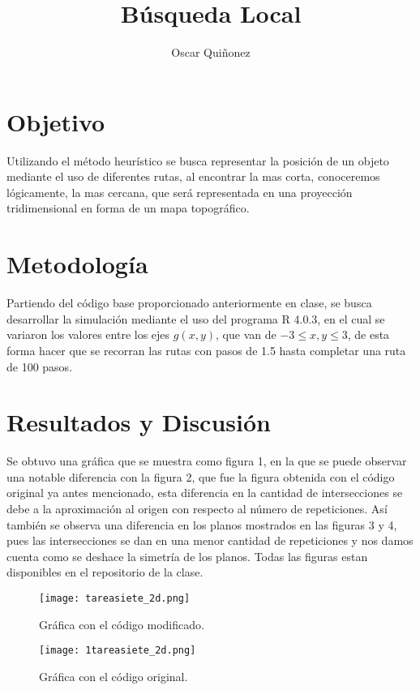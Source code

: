 \documentclass{article}
\title {B\'usqueda Local}
\author{Oscar Qui\~nonez}
\begin{document}
\maketitle
 
\section{Objetivo}\label{met}

Utilizando el m\'etodo heur\'istico se busca representar la posici\'on de un objeto mediante el uso de diferentes rutas, al encontrar la mas corta, conoceremos l\'ogicamente, la mas cercana, que ser\'a representada en una proyecci\'on tridimensional en forma de un mapa topogr\'afico.

\section{Metodolog\'ia}\label{met}

Partiendo del c\'odigo base \cite{satuelisa} proporcionado anteriormente en clase, se busca desarrollar la simulaci\'on mediante el uso del programa R 4.0.3, en el cual se variaron los valores entre los ejes $g(x,y)$, que van de $-3 \leq x, y \leq 3$, de esta forma hacer que se recorran las rutas con pasos de 1.5 hasta completar una ruta de 100 pasos.

\section{Resultados y Discusi\'on}\label{res}

Se obtuvo una gr\'afica que se muestra como figura 1, en la que se puede observar una notable diferencia con la figura 2, que fue la figura obtenida con el c\'odigo original ya antes mencionado, esta diferencia en la cantidad de intersecciones se debe a la aproximaci\'on al origen con respecto al n\'umero de repeticiones.
As\'i tambi\'en se observa una diferencia en los planos mostrados en las figuras 3 y 4, pues las intersecciones se dan en una menor cantidad de repeticiones y nos damos cuenta como se deshace la simetr\'ia de los planos. Todas las figuras estan disponibles \cite{yo} en el repositorio de la clase.
\begin{figure}
  \centering\texttt{[image: tareasiete\_2d.png]}
  \caption{Gr\'afica con el c\'odigo modificado.}
  \label{fig}
\end{figure}

\begin{figure}
  \centering\texttt{[image: 1tareasiete\_2d.png]}
  \caption{Gr\'afica con el c\'odigo original.}
  \label{fig}
\end{figure}
\end{document}
